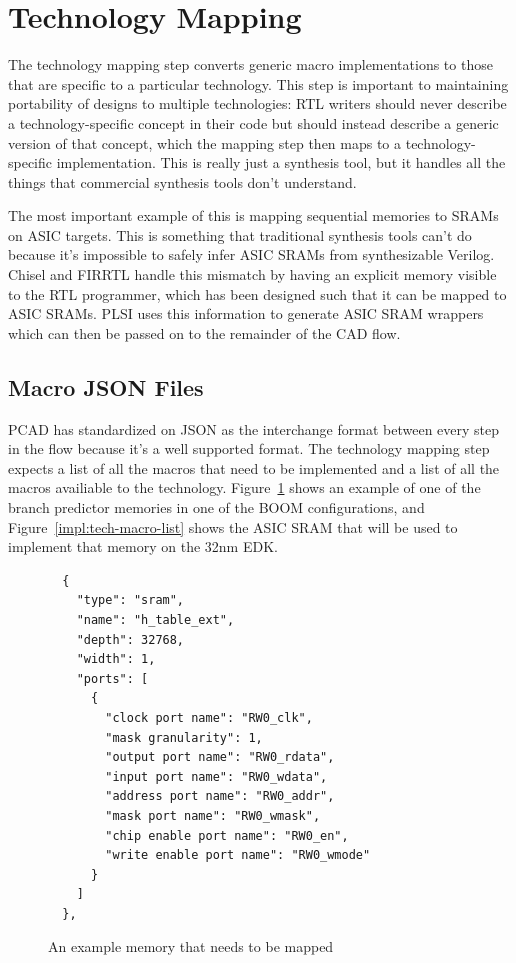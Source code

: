\documentclass{article}
\begin{document}
\section{Technology Mapping}

The technology mapping step converts generic macro implementations to those
that are specific to a particular technology.  This step is important to
maintaining portability of designs to multiple technologies: RTL writers should
never describe a technology-specific concept in their code but should instead
describe a generic version of that concept, which the mapping step then maps to
a technology-specific implementation.  This is really just a synthesis tool,
but it handles all the things that commercial synthesis tools don't understand.

The most important example of this is mapping sequential memories to SRAMs on
ASIC targets.  This is something that traditional synthesis tools can't do
because it's impossible to safely infer ASIC SRAMs from synthesizable Verilog.
Chisel and FIRRTL handle this mismatch by having an explicit memory visible to
the RTL programmer, which has been designed such that it can be mapped to ASIC
SRAMs.  PLSI uses this information to generate ASIC SRAM wrappers which can
then be passed on to the remainder of the CAD flow.

\subsection{Macro JSON Files}

PCAD has standardized on JSON as the interchange format between every step in
the flow because it's a well supported format.  The technology mapping step
expects a list of all the macros that need to be implemented and a list of all
the macros availiable to the technology.  Figure~\ref{impl:core-macro-list}
shows an example of one of the branch predictor memories in one of the BOOM
configurations, and Figure~\ref{impl:tech-macro-list} shows the ASIC SRAM that
will be used to implement that memory on the 32nm EDK.  

\begin{figure}
\begin{verbatim}
  {
    "type": "sram",
    "name": "h_table_ext",
    "depth": 32768,
    "width": 1,
    "ports": [
      {
        "clock port name": "RW0_clk",
        "mask granularity": 1,
        "output port name": "RW0_rdata",
        "input port name": "RW0_wdata",
        "address port name": "RW0_addr",
        "mask port name": "RW0_wmask",
        "chip enable port name": "RW0_en",
        "write enable port name": "RW0_wmode"
      }
    ]
  },
\end{verbatim}
  \caption{An example memory that needs to be mapped}
  \label{impl:core-macro-list}
\end{figure}
\end{document}
